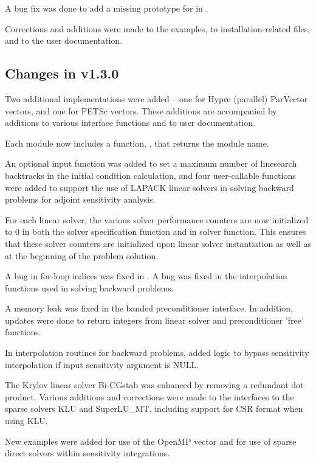 A bug fix was done to add a missing prototype for 
in .

Corrections and additions were made to the examples,
to installation-related files,
and to the user documentation.


\subsection*{Changes in v1.3.0}

Two additional {\nvector} implementations were added -- one for
Hypre (parallel) ParVector vectors, and one for PETSc vectors.  These
additions are accompanied by additions to various interface functions
and to user documentation.

Each {\nvector} module now includes a function, ,
that returns the {\nvector} module name.

An optional input function was added to set a maximum number
of linesearch backtracks in the initial condition calculation, and
four user-callable functions were added to support the use of LAPACK
linear solvers in solving backward problems for adjoint sensitivity
analysis.

For each linear solver, the various solver performance counters are
now initialized to 0 in both the solver specification function and in
solver  function.  This ensures that these solver counters
are initialized upon linear solver instantiation as well as at the
beginning of the problem solution.

A bug in for-loop indices was fixed in . A bug was
fixed in the interpolation functions used in solving backward problems.

A memory leak was fixed in the banded preconditioner interface.
In addition, updates were done to return integers from linear solver
and preconditioner 'free' functions.

In interpolation routines for backward problems, added logic to bypass
sensitivity interpolation if input sensitivity argument is NULL.

The Krylov linear solver Bi-CGstab was enhanced by removing a redundant
dot product.  Various additions and corrections were made to the
interfaces to the sparse solvers KLU and SuperLU\_MT, including support
for CSR format when using KLU.

New examples were added for use of the OpenMP vector and for use of
sparse direct solvers within sensitivity integrations.

